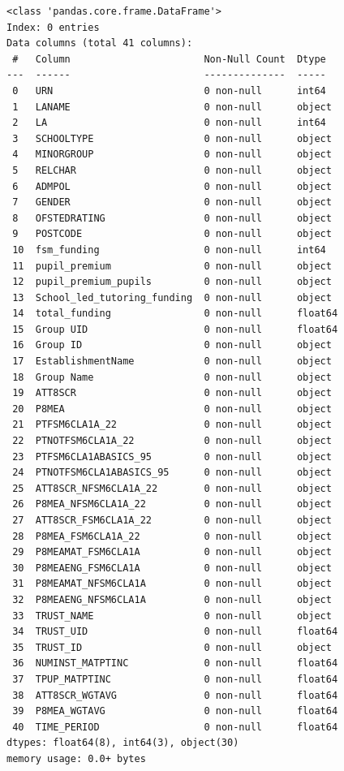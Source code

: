 \documentclass[
  letterpaper,
  DIV=11,
  numbers=noendperiod]{scrartcl}
\begin{document}
\begin{verbatim}
<class 'pandas.core.frame.DataFrame'>
Index: 0 entries
Data columns (total 41 columns):
 #   Column                       Non-Null Count  Dtype  
---  ------                       --------------  -----  
 0   URN                          0 non-null      int64  
 1   LANAME                       0 non-null      object 
 2   LA                           0 non-null      int64  
 3   SCHOOLTYPE                   0 non-null      object 
 4   MINORGROUP                   0 non-null      object 
 5   RELCHAR                      0 non-null      object 
 6   ADMPOL                       0 non-null      object 
 7   GENDER                       0 non-null      object 
 8   OFSTEDRATING                 0 non-null      object 
 9   POSTCODE                     0 non-null      object 
 10  fsm_funding                  0 non-null      int64  
 11  pupil_premium                0 non-null      object 
 12  pupil_premium_pupils         0 non-null      object 
 13  School_led_tutoring_funding  0 non-null      object 
 14  total_funding                0 non-null      float64
 15  Group UID                    0 non-null      float64
 16  Group ID                     0 non-null      object 
 17  EstablishmentName            0 non-null      object 
 18  Group Name                   0 non-null      object 
 19  ATT8SCR                      0 non-null      object 
 20  P8MEA                        0 non-null      object 
 21  PTFSM6CLA1A_22               0 non-null      object 
 22  PTNOTFSM6CLA1A_22            0 non-null      object 
 23  PTFSM6CLA1ABASICS_95         0 non-null      object 
 24  PTNOTFSM6CLA1ABASICS_95      0 non-null      object 
 25  ATT8SCR_NFSM6CLA1A_22        0 non-null      object 
 26  P8MEA_NFSM6CLA1A_22          0 non-null      object 
 27  ATT8SCR_FSM6CLA1A_22         0 non-null      object 
 28  P8MEA_FSM6CLA1A_22           0 non-null      object 
 29  P8MEAMAT_FSM6CLA1A           0 non-null      object 
 30  P8MEAENG_FSM6CLA1A           0 non-null      object 
 31  P8MEAMAT_NFSM6CLA1A          0 non-null      object 
 32  P8MEAENG_NFSM6CLA1A          0 non-null      object 
 33  TRUST_NAME                   0 non-null      object 
 34  TRUST_UID                    0 non-null      float64
 35  TRUST_ID                     0 non-null      object 
 36  NUMINST_MATPTINC             0 non-null      float64
 37  TPUP_MATPTINC                0 non-null      float64
 38  ATT8SCR_WGTAVG               0 non-null      float64
 39  P8MEA_WGTAVG                 0 non-null      float64
 40  TIME_PERIOD                  0 non-null      float64
dtypes: float64(8), int64(3), object(30)
memory usage: 0.0+ bytes
\end{verbatim}
\end{document}
